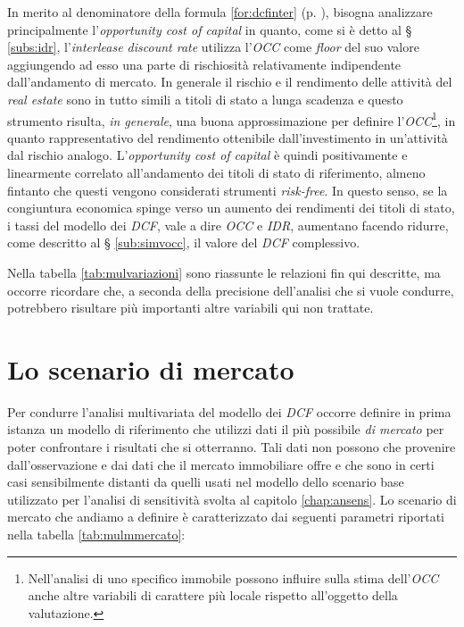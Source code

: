 In merito al denominatore della formula \ref{for:dcfinter} (p. \pageref{for:dcfinter}), bisogna analizzare principalmente l'{\itshape opportunity cost of capital} in quanto, come si è detto al § \ref{subs:idr}, l'{\itshape interlease discount rate} utilizza l'\textit{OCC} come \textit{floor} del suo valore aggiungendo ad esso una parte di rischiosità relativamente indipendente dall'andamento di mercato.
In generale il rischio e il rendimento delle attività del {\itshape real estate} sono in tutto simili a titoli di stato a lunga scadenza \cite[p. 136]{geltner} e questo strumento risulta, \textit{in generale}, una buona approssimazione per definire l'\textit{OCC}\footnote{Nell'analisi di uno specifico immobile possono influire sulla stima dell'\textit{OCC} anche altre variabili di carattere più locale rispetto all'oggetto della valutazione.}, in quanto rappresentativo del rendimento ottenibile dall'investimento in un'attività dal rischio analogo.
L'{\itshape opportunity cost of capital} è quindi positivamente e linearmente correlato all'andamento dei titoli di stato di riferimento, almeno fintanto che questi vengono considerati strumenti {\itshape risk-free}.
In questo senso, se la congiuntura economica spinge verso un aumento dei rendimenti dei titoli di stato, i tassi del modello dei \textit{DCF}, vale a dire \textit{OCC} e \textit{IDR}, aumentano facendo ridurre, come descritto al § \ref{sub:simvocc}, il valore del \textit{DCF} complessivo.

Nella tabella \ref{tab:mulvariazioni} sono riassunte le relazioni fin qui descritte, ma occorre ricordare che, a seconda della precisione dell'analisi che si vuole condurre, potrebbero risultare più importanti altre variabili qui non trattate.

\section{Lo scenario di mercato}
\label{sec:scenmercato}
Per condurre l'analisi multivariata del modello dei \textit{DCF} occorre definire in prima istanza un modello di riferimento che utilizzi dati il più possibile {\itshape di mercato} per poter confrontare i risultati che si otterranno. Tali dati non possono che provenire dall'osservazione e dai dati che il mercato immobiliare offre e che sono in certi casi sensibilmente distanti da quelli usati nel modello dello scenario base utilizzato per l'analisi di sensitività svolta al capitolo \ref{chap:ansens}.
Lo scenario di mercato che andiamo a definire è caratterizzato dai seguenti parametri riportati nella tabella \ref{tab:mulmmercato}:


